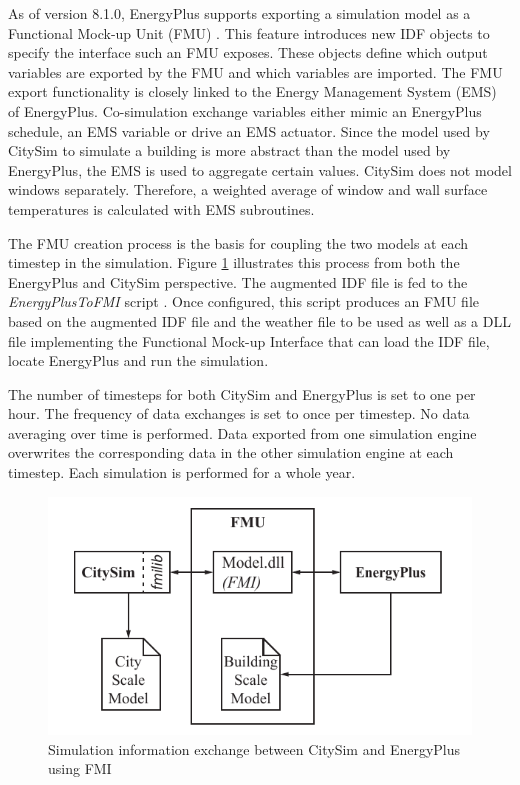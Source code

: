 \documentclass{tBPS2e}
\theoremstyle{plain}
\theoremstyle{definition}
\theoremstyle{remark}
\begin{document}
As of version 8.1.0, EnergyPlus supports exporting a simulation model as a
Functional Mock-up Unit (FMU) \citep{nouidui_functional_2014}. This
feature introduces new IDF objects to specify the interface such an FMU
exposes. These objects define which output variables are exported by the FMU
and which variables are imported. The FMU export functionality is closely
linked to the Energy Management System (EMS) of EnergyPlus. Co-simulation
exchange variables either mimic an EnergyPlus schedule, an EMS variable or
drive an EMS actuator. Since the model used by CitySim to simulate a building
is more abstract than the model used by EnergyPlus, the EMS is used to
aggregate certain values. CitySim does not model windows separately. Therefore,
a weighted average of window and wall surface temperatures is calculated with
EMS subroutines.

The FMU creation process is the basis for coupling the two models at each
timestep in the simulation. Figure \ref{fig:FMUOverview} illustrates this
process from both the EnergyPlus and CitySim perspective. The augmented IDF
file is fed to the \emph{EnergyPlusToFMI} script \citep{nouidui_tool_2014}. Once
configured, this script produces an FMU file based on the augmented IDF file
and the weather file to be used as well as a DLL file implementing the
Functional Mock-up Interface that can load the IDF file, locate EnergyPlus and
run the simulation.

The number of timesteps for both CitySim and EnergyPlus is set to one per hour. 
The frequency of data exchanges is set to once per timestep. No data averaging over time 
is performed. Data exported from one simulation engine overwrites the corresponding data
in the other simulation engine at each timestep. Each simulation is performed for a whole 
year.

\begin{figure}[H]
\centering
\includegraphics[scale=0.7]{figures/UMEM_FMU_Overview}
\caption{Simulation information exchange between CitySim and EnergyPlus using FMI \citep{thomas_multiscale_2014}}
\label{fig:FMUOverview}
\end{figure}
\end{document}
